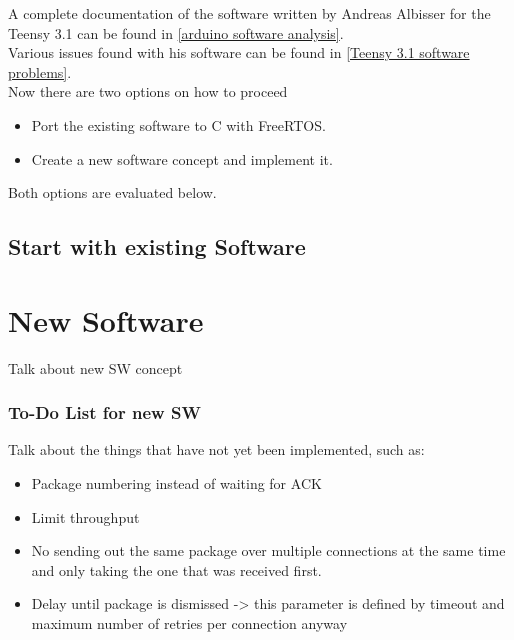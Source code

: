 %
A complete documentation of the software written by Andreas Albisser for the Teensy 3.1 can be found in \ref{arduino software analysis}.\\
Various issues found with his software can be found in \ref{Teensy 3.1 software problems}.\\
Now there are two options on how to proceed
\begin{itemize}
    \item Port the existing software to C with FreeRTOS.
    \item Create a new software concept and implement it.
\end{itemize}
Both options are evaluated below.\\
\subsection{Start with existing Software}

%
\section{New Software}%
%
Talk about new SW concept
%
\subsubsection{To-Do List for new SW}%
%
Talk about the things that have not yet been implemented, such as:
\begin{itemize}
    \item Package numbering instead of waiting for ACK
    \item Limit throughput
    \item No sending out the same package over multiple connections at the same time and only taking the one that was received first.
    \item Delay until package is dismissed -> this parameter is defined by timeout and maximum number of retries per connection anyway
\end{itemize}